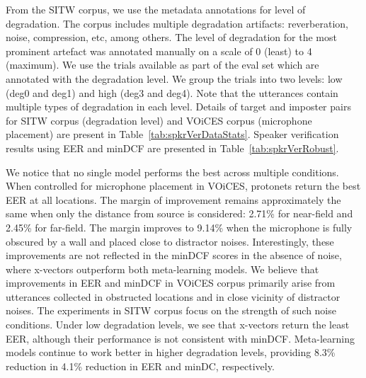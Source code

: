 From the SITW corpus, we use the metadata annotations for level of degradation. The corpus includes multiple degradation artifacts: reverberation, noise, compression, etc, among others. The level of degradation for the most prominent artefact was annotated manually on a scale of 0 (least) to 4 (maximum). We use the trials available as part of the eval set which are annotated with the degradation level. We group the trials into two levels: low (deg0 and deg1) and high (deg3 and deg4). Note that the utterances contain multiple types of degradation in each level. 
Details of target and imposter pairs for SITW corpus (degradation level) and VOiCES corpus (microphone placement) are present in Table~\ref{tab:spkrVerDataStats}. Speaker verification results using EER and minDCF are presented in Table~\ref{tab:spkrVerRobust}.

We notice that no single model performs the best across multiple conditions. When controlled for microphone placement in VOiCES, protonets return the best EER at all locations. The margin of improvement remains approximately the same when only the distance from source is considered: 2.71\% for near-field and 2.45\% for far-field. The margin improves to 9.14\% when the microphone is fully obscured by a wall and placed close to distractor noises. Interestingly, these improvements are not reflected in the minDCF scores in the absence of noise, where x-vectors outperform both meta-learning models. %
We believe that improvements in EER and minDCF in VOiCES corpus primarily arise from utterances collected in obstructed locations and in close vicinity of distractor noises. The experiments in SITW corpus focus on the strength of such noise conditions. Under low degradation levels, we see that x-vectors return the least EER, although their performance is not consistent with minDCF. Meta-learning models continue to work better in higher degradation levels, providing 8.3\% reduction in 4.1\% reduction in EER and minDC, respectively. %




